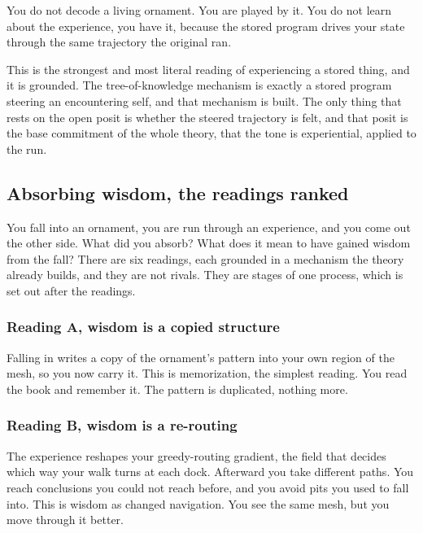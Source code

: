 \begin{principle}
You do not decode a living ornament. You are played by it. You do not learn about the experience, you have it, because the stored program drives your state through the same trajectory the original ran.
\end{principle}

This is the strongest and most literal reading of experiencing a stored thing, and it is grounded. The tree-of-knowledge mechanism is exactly a stored program steering an encountering self, and that mechanism is built. The only thing that rests on the open posit is whether the steered trajectory is felt, and that posit is the base commitment of the whole theory, that the tone is experiential, applied to the run.

\subsection{Absorbing wisdom, the readings ranked}

You fall into an ornament, you are run through an experience, and you come out the other side. What did you absorb? What does it mean to have gained wisdom from the fall? There are six readings, each grounded in a mechanism the theory already builds, and they are not rivals. They are stages of one process, which is set out after the readings.

\subsubsection{Reading A, wisdom is a copied structure}

Falling in writes a copy of the ornament's pattern into your own region of the mesh, so you now carry it. This is memorization, the simplest reading. You read the book and remember it. The pattern is duplicated, nothing more.

\subsubsection{Reading B, wisdom is a re-routing}

The experience reshapes your greedy-routing gradient, the field that decides which way your walk turns at each dock. Afterward you take different paths. You reach conclusions you could not reach before, and you avoid pits you used to fall into. This is wisdom as changed navigation. You see the same mesh, but you move through it better.

